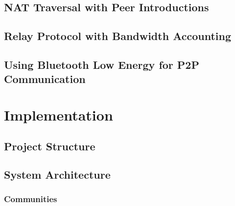 
\section{NAT Traversal with Peer Introductions}




\section{Relay Protocol with Bandwidth Accounting}

\section{Using Bluetooth Low Energy for P2P Communication}


\chapter{Implementation}

\section{Project Structure}


\section{System Architecture}

\subsection{Communities}

